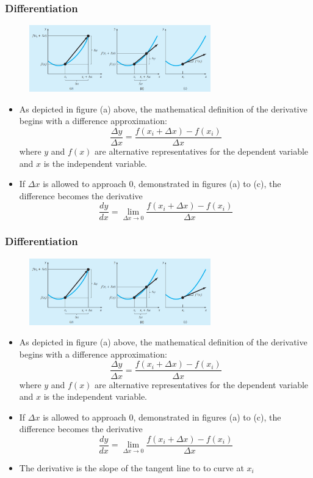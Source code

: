 \documentclass{if-beamer}
\begin{document}
\begin{frame}[t]
	\frametitle{Differentiation}
	\begin{figure}
		\centering
		\includegraphics[width = 0.7\textwidth]{figures/figure1}
	\end{figure}
	\begin{itemize}
		\item As depicted in figure (a) above, the
		mathematical definition of the derivative begins with a difference approximation:
		$$\frac{\Delta y}{\Delta x} = \frac{f(x_i+\Delta x)- f(x_i)}{\Delta x} $$
		where $y$ and $f(x)$ are alternative representatives for the dependent variable and $x$ is the independent variable. 
		\item If $\Delta x$ is allowed to approach 0, demonstrated in figures (a) to (c), the difference becomes the derivative
		$$\frac{dy}{dx} = \lim_{\Delta x \rightarrow 0} \frac{f(x_i+\Delta x)- f(x_i)}{\Delta x}$$
	\end{itemize}	
\end{frame}

\begin{frame}[t]
	\frametitle{Differentiation}
	\begin{figure}
		\centering
		\includegraphics[width = 0.7\textwidth]{figures/figure1}
	\end{figure}
	\begin{itemize}
		\item As depicted in figure (a) above, the
		mathematical definition of the derivative begins with a difference approximation:
		$$\frac{\Delta y}{\Delta x} = \frac{f(x_i+\Delta x)- f(x_i)}{\Delta x} $$
		where $y$ and $f(x)$ are alternative representatives for the dependent variable and $x$ is the independent variable. 
		\item If $\Delta x$ is allowed to approach 0, demonstrated in figures (a) to (c), the difference becomes the derivative
		$$\frac{dy}{dx} = \lim_{\Delta x \rightarrow 0} \frac{f(x_i+\Delta x)- f(x_i)}{\Delta x}$$
		\item The derivative is the slope of the tangent line to to curve at $x_i$
	\end{itemize}	
\end{frame}
\end{document}
